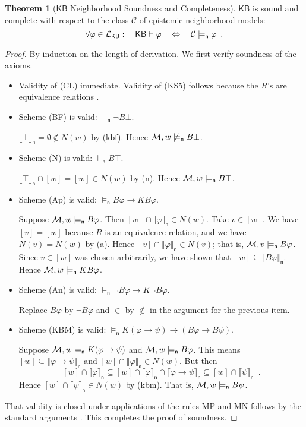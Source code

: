\documentclass[12pt]{article}
\theoremstyle{definition}
\newtheorem{theorem}{Theorem}[section]
\newcommand{\M}{{\cal M}}      %
\newcommand{\Lang}{{\cal L}}   %
\newcommand{\KB}{{\mathsf{KB}}}                 %
\newcommand{\modelsn}{\models_{\mathsf{n}}}                  %
\newcommand{\semn}[1]{\llbracket{#1}\rrbracket_{\mathsf{n}}} %
\begin{document}
\begin{theorem}[$\KB$ Neighborhood Soundness and Completeness]
  \label{theorem:KB-neighborhood-soundness}\label{theorem:KB-neighborhood-completeness}
  $\KB$ is sound and complete with respect to the class $\mathcal{C}$
  of epistemic neighborhood models:
  \[
  \forall\varphi\in\Lang_\KB:\quad\KB\vdash\varphi
  \quad\Leftrightarrow\quad
  \mathcal{C}\modelsn\varphi
  \enspace.
  \]
\end{theorem}
\begin{proof}
  By induction on the length of derivation.  We first
  verify soundness of the axioms.
  \begin{itemize}
  \item Validity of (CL) immediate. Validity of (KS5) follows because
    the $R$'s are equivalence relations \cite{BlaRijVen:ml}.

  \item Scheme (BF) is valid: $\modelsn\lnot B\bot$.

    $\semn{\bot}=\emptyset\notin N(w)$ by (kbf).  Hence
    $\M,w\not\modelsn B\bot$.

  \item Scheme (N) is valid: $\modelsn B\top$.

    $\semn{\top}\cap[w]=[w]\in N(w)$ by (n).  Hence
    $\M,w\modelsn B\top$.

  \item Scheme (Ap) is valid: $\modelsn B\varphi\to K B\varphi$.

    Suppose $\M,w\modelsn B\varphi$. Then $[w]\cap\semn{\varphi}\in
    N(w)$.  Take $v\in[w]$.  We have $[v]=[w]$ because $R$
    is an equivalence relation, and we have $N(v)=N(w)$ by (a).
    Hence $[v]\cap\semn{\varphi}\in N(v)$; that is, $\M,v\modelsn
    B\varphi$.  Since $v\in [w]$ was chosen arbitrarily, we have
    shown that $[w]\subseteq\semn{B\varphi}$.  Hence $\M,w\modelsn
    K B\varphi$.

  \item Scheme (An) is valid: $\modelsn \lnot B\varphi\to K\lnot
    B\varphi$.

    Replace $B\varphi$ by $\lnot B\varphi$ and $\in$ by $\notin$ in the
    argument for the previous item.

  \item Scheme (KBM) is valid: $\modelsn
    K(\varphi\to\psi)\to(B\varphi\to B\psi)$.

    Suppose $\M,w\modelsn K(\varphi\to\psi)$ and $\M,w\modelsn
    B\varphi$.  This means $[w]\subseteq\semn{\varphi\to\psi}$ and
    $[w]\cap\semn{\varphi}\in N(w)$. But then
    \[
    [w]\cap\semn{\varphi}\subseteq
    [w]\cap\semn{\varphi}\cap\semn{\varphi\to\psi}\subseteq
    [w]\cap\semn{\psi}\enspace.
    \]
    Hence $[w]\cap\semn{\psi}\in N(w)$ by (kbm).  That is,
    $\M,w\modelsn B\psi$.
  \end{itemize}
  That validity is closed under applications of the rules MP and MN
  follows by the standard arguments \cite{BlaRijVen:ml}.  This
  completes the proof of soundness.


\end{proof}
\end{document}
